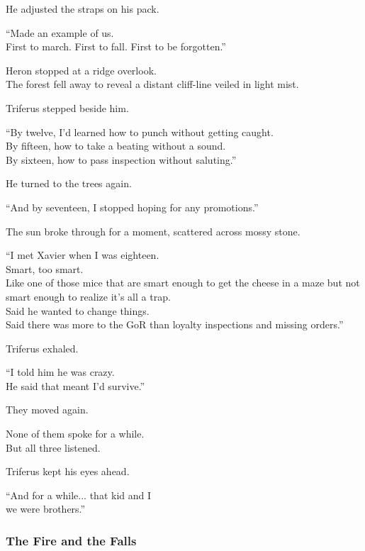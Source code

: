 \documentclass[12pt]{article}
\begin{document}
He adjusted the straps on his pack.

“Made an example of us.\\
First to march. First to fall. First to be forgotten.”

\vspace{1em}

Heron stopped at a ridge overlook.\\
The forest fell away to reveal a distant cliff-line veiled in light mist.

Triferus stepped beside him.

“By twelve, I’d learned how to punch without getting caught.\\
By fifteen, how to take a beating without a sound.\\
By sixteen, how to pass inspection without saluting.”

He turned to the trees again.

“And by seventeen, I stopped hoping for any promotions.”

\vspace{1em}

The sun broke through for a moment, scattered across mossy stone.

“I met Xavier when I was eighteen.\\
Smart, too smart.\\
Like one of those mice that are smart enough to get the cheese in a maze but not smart enough to realize it's all a trap.\\
Said he wanted to change things.\\
Said there was more to the GoR than loyalty inspections and missing orders.”

Triferus exhaled.

“I told him he was crazy.\\
He said that meant I’d survive.”

\vspace{1em}

They moved again.

None of them spoke for a while.\\
But all three listened.

Triferus kept his eyes ahead.

“And for a while... that kid and I\\
we were brothers.”

\dotfill

\subsubsection{The Fire and the Falls}
\end{document}

